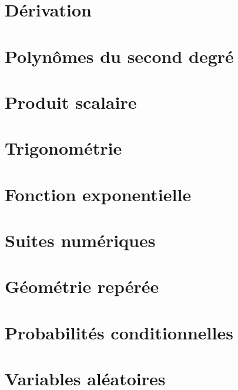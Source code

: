 \documentclass[oneside,12pt]{article}
\let\oldsection\section
\renewcommand{\section}{\newpage\oldsection}
\begin{document}



\section{Dérivation}


\section{Polynômes du second degré}


\section{Produit scalaire}


\section{Trigonométrie}


\section{Fonction exponentielle}


\section{Suites numériques}


\section{Géométrie repérée}


\section{Probabilités conditionnelles}


\section{Variables aléatoires}
\end{document}
